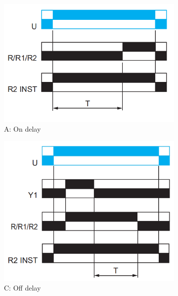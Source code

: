 \begin{figure}
	\centering
	\begin{subfigure}[b]{0.32\textwidth}
		\centering
		\includegraphics[width=\textwidth]{Imagenes/A-OnDelay}
		\caption{A: On delay }
		\label{fig:on-delay}
	\end{subfigure}
	\begin{subfigure}[b]{0.32\textwidth}
		\centering
		\includegraphics[width=\textwidth]{Imagenes/C-OffDelay}
		\caption{C: Off delay}
		\label{fig:Off-delay}
	\end{subfigure}
	\begin{subfigure}[b]{0.32\textwidth}
	\centering

\end{subfigure}
\end{figure}
